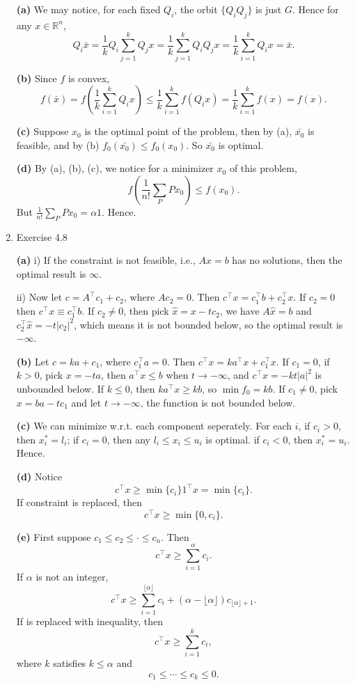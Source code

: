 \documentclass{article}%
\begin{document}
\begin{enumerate}
\textbf{(a)} We may notice, for each fixed $Q_i $, the orbit $\{Q_iQ_j\} $ is just $G$. Hence for any $x\in\mathbb{R}^n $,
$$
Q_i\bar{x} = \frac{1}{k}Q_i\sum_{j=1}^{k}Q_jx = \frac{1}{k}\sum_{j=1}^{k}Q_iQ_jx = \frac{1}{k}\sum_{i=1}^{k}Q_i x = \bar{x}.
$$

\textbf{(b)} Since $f$ is convex,
$$
f(\bar{x}) = f(\frac{1}{k}\sum_{i=1}^{k}Q_ix)\le \frac{1}{k}\sum_{i=1}^{k}f(Q_i x) = \frac{1}{k}\sum_{i=1}^{k}f(x) = f(x).
$$

\textbf{(c)} Suppose $x_0 $ is the optimal point of the problem, then by (a), $\bar{x_0}$ is feasible, and by (b) $f_0(\bar{x_0})\le f_0(x_0) $. So $\bar{x_0}$ is optimal.

\textbf{(d)} By (a), (b), (c), we notice for a minimizer $x_0 $ of this problem,
$$
f(\frac{1}{n!}\sum_{P}Px_0)\le f(x_0).
$$
But $\frac{1}{n!}\sum_{P}Px_0 = \alpha 1$. Hence.

\item Exercise 4.8

\textbf{(a)} i) If the constraint is not feasible, i.e., $Ax = b$ has no solutions, then the optimal result is $\infty$.

ii) Now let $c = A^\top c_1+c_2 $, where $Ac_2 = 0 $. Then $c^\top x = c_1^\top b + c_2^\top x $. If $c_2 = 0$ then $c^\top x\equiv c_1^\top b $. If $c_2\ne 0 $, then pick $\hat{x} = x-tc_2 $, we have $A\hat{x} = b$ and $c_2^\top \hat{x} = -t|c_2|^2 $, which means it is not bounded below, so the optimal result is $-\infty$.

\textbf{(b)} Let $c = ka+c_1 $, where $c_1^\top a = 0 $. Then $c^\top x = ka^\top x + c_1^\top x $. If $c_1 = 0$, if $k > 0$, pick $x = -ta$, then $a^\top x \le b$ when $t\to-\infty$, and $c^\top x = -kt|a|^2 $ is unbounded below. If $k \le 0$, then $ka^\top x\ge kb $, so $\min f_0 = kb$. If $c_1 \ne 0$, pick $x = ba - tc_1 $ and let $t\to -\infty$, the function is not bounded below.

\textbf{(c)} We can minimize w.r.t. each component seperately. For each $i$, if $c_i > 0  $, then $x_i^* = l_i $; if $c_i = 0 $, then any $l_i\le x_i \le u_i $ is optimal. if $c_i < 0 $, then $x_i^* = u_i $. Hence.

\textbf{(d)} Notice
$$
c^\top x\ge \min\{c_i\}1^\top x = \min\{c_i\}.
$$
If constraint is replaced, then 
$$
c^\top x \ge \min\{0, c_i\}.
$$

\textbf{(e)} First suppose $c_1\le c_2\le\cdot \le c_n $. Then 
$$
c^\top x\ge \sum_{i=1}^{\alpha}c_i.
$$
If $\alpha$ is not an integer, 
$$
c^\top x\ge \sum_{i=1}^{\lfloor \alpha\rfloor}c_i + (\alpha-\lfloor \alpha\rfloor)c_{\lfloor \alpha\rfloor+1}.
$$
If is replaced with inequality, then
$$
c^\top x\ge \sum_{i=1}^{k}c_i,
$$
where $k$ satisfies $k\le \alpha$ and
$$
c_1\le \cdots \le c_k \le 0.
$$


\end{enumerate}
\end{document}

